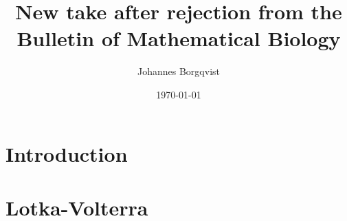\documentclass[12pt]{article}
\begin{document}
\title{\textbf{New take after rejection from the Bulletin of Mathematical Biology}}
\author{Johannes Borgqvist}
\date{\today}
\maketitle
\tableofcontents
\clearpage
\section{Introduction}

\section{Lotka-Volterra}

%
%
%
%
\end{document}
